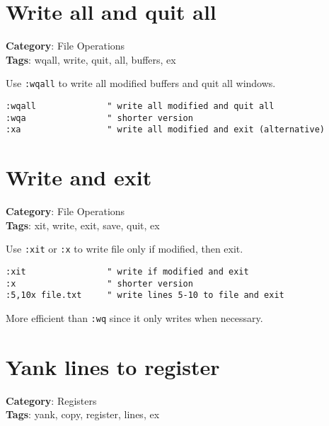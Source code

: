{{{{{\section{Write all and quit all}

\textbf{Category}: File Operations\\ \textbf{Tags}: wqall, write, quit, all, buffers, ex
\vspace{0.5cm}

Use {\footnotesize \Verb§:wqall§} to write all modified buffers and quit all windows.

\begin{Exa*}{}
\begin{Verbatim}[fontsize=\footnotesize, breaklines, breakanywhere]
:wqall              " write all modified and quit all
:wqa                " shorter version
:xa                 " write all modified and exit (alternative)
\end{Verbatim}
\end{Exa*}

\section{Write and exit}

\textbf{Category}: File Operations\\ \textbf{Tags}: xit, write, exit, save, quit, ex
\vspace{0.5cm}

Use {\footnotesize \Verb§:xit§} or {\footnotesize \Verb§:x§} to write file only if modified, then exit.

\begin{Exa*}{}
\begin{Verbatim}[fontsize=\footnotesize, breaklines, breakanywhere]
:xit                " write if modified and exit
:x                  " shorter version
:5,10x file.txt     " write lines 5-10 to file and exit
\end{Verbatim}
\end{Exa*}

More efficient than {\footnotesize \Verb§:wq§} since it only writes when necessary.

\section{Yank lines to register}

\textbf{Category}: Registers\\ \textbf{Tags}: yank, copy, register, lines, ex
\vspace{0.5cm}

}}}}}
